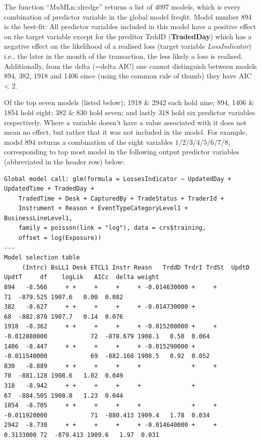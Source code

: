 \documentclass{DissertateUSU}
\begin{document}
\singlespacing

\doublespacing

The function ``MuMLn::dredge'' returns a list of \(4097\) models, which
is every combination of predictor variable in the global model freqfit.
Model number 894 is the best-fit: All predictor variables included in
this model have a positive effect on the target variable except for the
preditor TrddD (\textbf{TradedDay}) which has a negative effect on the
likelihood of a realised loss (target variable \emph{LossIndicator})
i.e., the later in the month of the transaction, the less likely a loss
is realised. Additionally, from the delta (=delta AIC) one cannot
distinguish between models 894, 382, 1918 and 1406 since (using the
common rule of thumb) they have AIC \textless{} 2.\medskip

Of the top seven models (listed below); 1918 \& 2942 each hold nine;
894, 1406 \& 1854 hold eight; 382 \& 830 hold seven; and lastly 318 hold
six predictor variables respectively. Where a variable doesn't have a
value associated with it does not mean no effect, but rather that it was
not included in the model. For example, model \(894\) returns a
combination of the eight variables \(1/2/3/4/5/6/7/8\), corresponding to
top most model in the following output predictor variables (abbreviated
in the header row) below:

\singlespacing
\begin{verbatim}
Global model call: glm(formula = LossesIndicator ~ UpdatedDay + UpdatedTime + TradedDay + 
    TradedTime + Desk + CapturedBy + TradeStatus + TraderId + 
    Instrument + Reason + EventTypeCategoryLevel1 + BusinessLineLevel1, 
    family = poisson(link = "log"), data = crs$training, 
    offset = log(Exposure))
---
Model selection table 
     (Intrc) BsLL1 Desk ETCL1 Instr Reasn   TrddD TrdrI TrdSt  UpdtD      UpdtT     df    logLik   AICc  delta weight
894   -8.566     + +     +     +     + -0.014630000 +     +                         71  -879.525 1907.6   0.00  0.082
382   -8.627     + +     +     +     + -0.014730000 +                               68  -882.870 1907.7   0.14  0.076
1918  -8.362     + +     +     +     + -0.015200000 +     + -0.012880000            72  -878.679 1908.1   0.50  0.064
1406  -8.447     + +     +     +     + -0.015290000 +       -0.011540000            69  -882.168 1908.5   0.92  0.052
830   -8.889     + +     +     +     +              +     +                         70  -881.128 1908.6   1.02  0.049
318   -8.942     + +     +     +     +              +                               67  -884.505 1908.8   1.23  0.044
1854  -8.705     + +     +     +     +              +     + -0.011920000            71  -880.413 1909.4   1.78  0.034
2942  -8.730     + +     +     +     + -0.014640000 +     +               0.3133000 72  -879.413 1909.6   1.97  0.031

\end{verbatim}
\doublespacing
\end{document}
